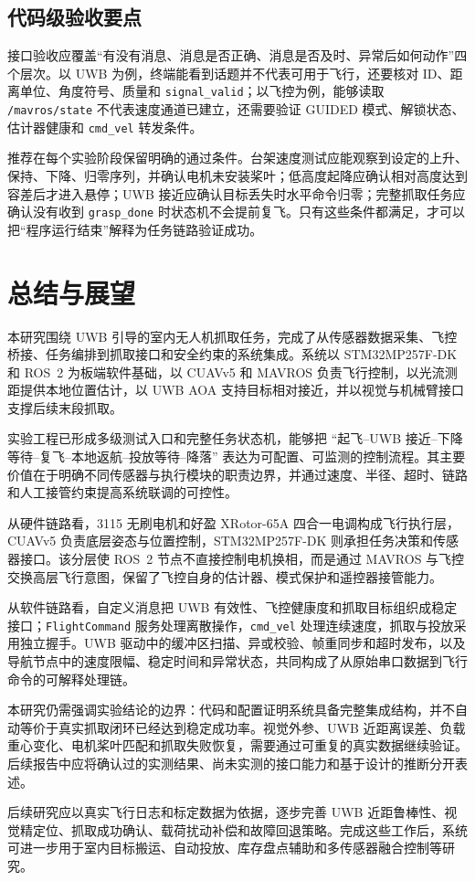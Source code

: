 \documentclass[12pt,a4paper]{ctexart}
\begin{document}
\subsection{代码级验收要点}
接口验收应覆盖“有没有消息、消息是否正确、消息是否及时、异常后如何动作”四个层次。以 UWB 为例，终端能看到话题并不代表可用于飞行，还要核对 ID、距离单位、角度符号、质量和 \texttt{signal\_valid}；以飞控为例，能够读取 \texttt{/mavros/state} 不代表速度通道已建立，还需要验证 GUIDED 模式、解锁状态、估计器健康和 \texttt{cmd\_vel} 转发条件。

推荐在每个实验阶段保留明确的通过条件。台架速度测试应能观察到设定的上升、保持、下降、归零序列，并确认电机未安装桨叶；低高度起降应确认相对高度达到容差后才进入悬停；UWB 接近应确认目标丢失时水平命令归零；完整抓取任务应确认没有收到 \texttt{grasp\_done} 时状态机不会提前复飞。只有这些条件都满足，才可以把“程序运行结束”解释为任务链路验证成功。

\clearpage
\section{总结与展望}
本研究围绕 UWB 引导的室内无人机抓取任务，完成了从传感器数据采集、飞控桥接、任务编排到抓取接口和安全约束的系统集成。系统以 STM32MP257F-DK 和 ROS~2 为板端软件基础，以 CUAVv5 和 MAVROS 负责飞行控制，以光流测距提供本地位置估计，以 UWB AOA 支持目标相对接近，并以视觉与机械臂接口支撑后续末段抓取。

实验工程已形成多级测试入口和完整任务状态机，能够把 ``起飞--UWB 接近--下降等待--复飞--本地返航--投放等待--降落'' 表达为可配置、可监测的控制流程。其主要价值在于明确不同传感器与执行模块的职责边界，并通过速度、半径、超时、链路和人工接管约束提高系统联调的可控性。

从硬件链路看，3115 无刷电机和好盈 XRotor-65A 四合一电调构成飞行执行层，CUAVv5 负责底层姿态与位置控制，STM32MP257F-DK 则承担任务决策和传感器接口。该分层使 ROS~2 节点不直接控制电机换相，而是通过 MAVROS 与飞控交换高层飞行意图，保留了飞控自身的估计器、模式保护和遥控器接管能力。

从软件链路看，自定义消息把 UWB 有效性、飞控健康度和抓取目标组织成稳定接口；\texttt{FlightCommand} 服务处理离散操作，\texttt{cmd\_vel} 处理连续速度，抓取与投放采用独立握手。UWB 驱动中的缓冲区扫描、异或校验、帧重同步和超时发布，以及导航节点中的速度限幅、稳定时间和异常状态，共同构成了从原始串口数据到飞行命令的可解释处理链。

本研究仍需强调实验结论的边界：代码和配置证明系统具备完整集成结构，并不自动等价于真实抓取闭环已经达到稳定成功率。视觉外参、UWB 近距离误差、负载重心变化、电机桨叶匹配和抓取失败恢复，需要通过可重复的真实数据继续验证。后续报告中应将确认过的实测结果、尚未实测的接口能力和基于设计的推断分开表述。

后续研究应以真实飞行日志和标定数据为依据，逐步完善 UWB 近距鲁棒性、视觉精定位、抓取成功确认、载荷扰动补偿和故障回退策略。完成这些工作后，系统可进一步用于室内目标搬运、自动投放、库存盘点辅助和多传感器融合控制等研究。
\end{document}
